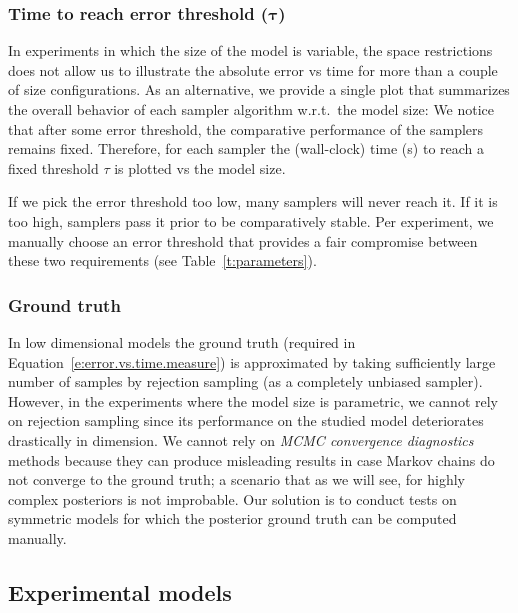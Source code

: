 \documentclass[]{article}
\begin{document}
\subsubsection*{Time to reach error threshold ($\boldsymbol\tau$)}
In experiments in which the size of the model is variable, 
the space restrictions does not allow us to illustrate the absolute error vs time 
for more than a couple of size configurations.
As an alternative, we provide a single plot that summarizes the overall behavior of each sampler algorithm w.r.t.\ the model size:
We notice that after some error threshold, the comparative performance of the samplers remains fixed.
Therefore, for each sampler the (wall-clock) time (s) to reach a fixed threshold $\tau$ is plotted vs the model size.

If we pick the error threshold too low, many samplers will never reach it. 
If it is too high, samplers pass it prior to be comparatively stable. 
Per experiment, we manually choose  an error threshold that provides a fair compromise between these two requirements
(see Table~\ref{t:parameters}).

\subsubsection*{Ground truth}
In low dimensional models %
the ground truth (required in Equation~\ref{e:error.vs.time.measure})
is approximated by taking sufficiently large number of samples by rejection sampling (as a completely unbiased sampler).
However, in the experiments where the model size is parametric,
we cannot rely on rejection sampling since its performance on the studied model deteriorates drastically in dimension. 
We cannot rely on \emph{MCMC convergence diagnostics} methods \citep{cowles1996markov} because they can produce misleading results in case Markov chains do not converge to the ground truth; a scenario that as we will see, for highly complex posteriors is not improbable.
Our solution is to conduct tests on symmetric models for which the posterior ground truth can be computed manually.


\subsection{Experimental models}
\label{sect:experimental.results.models}
\end{document}
